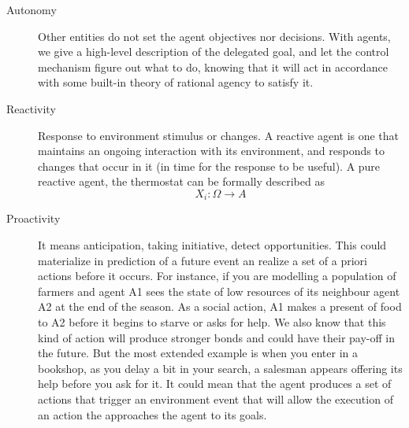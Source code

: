\documentclass[11pt,oneside,a4paper,openright]{report}
\begin{document}
\begin{description}
	\item [Autonomy] Other entities do not set the agent objectives nor decisions. With agents, 
	we give a high-level description of the delegated goal, and let the control mechanism figure
	out what to do, knowing that it will act in accordance with some built-in theory of rational 
	agency to satisfy it.

	\item [Reactivity] Response to environment stimulus or changes. A reactive agent is 
	one that maintains an ongoing interaction with its environment, and responds to changes 
	that occur in it (in time for the response to be useful). A pure reactive agent, the 
	thermostat can be formally described as
	\begin{equation}
		X_i : \Omega \longrightarrow A 
	\end{equation}
	\item [Proactivity] It means anticipation, taking initiative, detect opportunities. This
	could materialize in prediction of a future event an realize a set of a priori actions 
	before it occurs. For instance, if you are modelling a population of farmers and agent A1 
	sees the state of low resources of its neighbour agent A2 at the end of the season. As 
	a social action, A1 makes a present of food to A2 before it begins to starve or asks for
	help. We also know that this kind of action will produce stronger bonds and could have their
	pay-off in the future. But the most extended example is when you enter in a bookshop, 
	as you delay a bit in your search, a salesman appears offering its help before you ask for it.
	It could mean that the agent produces a set of actions that trigger an environment event
	that will allow the execution of an action the approaches the agent to its goals.


\end{description}
\end{document}

